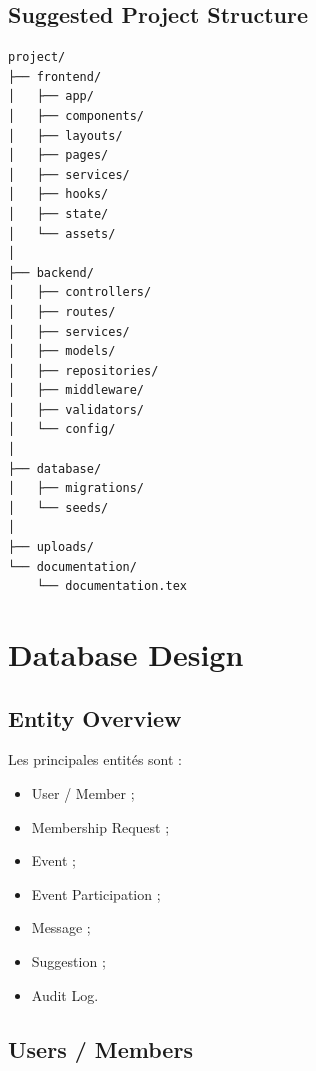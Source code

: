 \documentclass[11pt,a4paper]{report}
\begin{document}
\section{Suggested Project Structure}

\begin{lstlisting}
project/
├── frontend/
│   ├── app/
│   ├── components/
│   ├── layouts/
│   ├── pages/
│   ├── services/
│   ├── hooks/
│   ├── state/
│   └── assets/
│
├── backend/
│   ├── controllers/
│   ├── routes/
│   ├── services/
│   ├── models/
│   ├── repositories/
│   ├── middleware/
│   ├── validators/
│   └── config/
│
├── database/
│   ├── migrations/
│   └── seeds/
│
├── uploads/
└── documentation/
    └── documentation.tex
\end{lstlisting}

\chapter{Database Design}

\section{Entity Overview}

Les principales entités sont :

\begin{itemize}
    \item User / Member ;
    \item Membership Request ;
    \item Event ;
    \item Event Participation ;
    \item Message ;
    \item Suggestion ;
    \item Audit Log.
\end{itemize}

\section{Users / Members}
\end{document}
